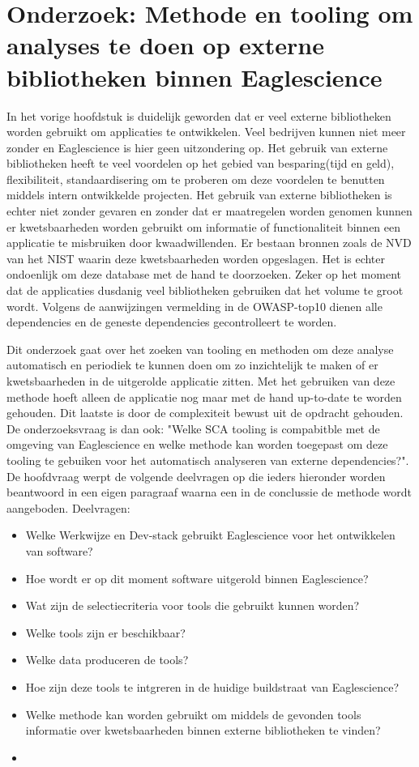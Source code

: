 
\chapter{Onderzoek: Methode en tooling om analyses te doen op externe bibliotheken binnen Eaglescience}\label{ch:onderzoek:-methode-en-tooling-om-analyses-te-doen-op-externe-bibliotheken-binnen-Eaglescience}
In het vorige hoofdstuk is duidelijk geworden dat er veel externe bibliotheken worden gebruikt om applicaties te ontwikkelen. Veel bedrijven kunnen niet meer zonder en Eaglescience is hier geen uitzondering op. Het gebruik van externe bibliotheken heeft te veel voordelen op het gebied van besparing(tijd en geld), flexibiliteit, standaardisering om te proberen om deze voordelen te benutten middels intern ontwikkelde projecten. Het gebruik van externe bibliotheken is echter niet zonder gevaren en zonder dat er maatregelen worden genomen kunnen er kwetsbaarheden worden gebruikt om informatie of functionaliteit binnen een applicatie te misbruiken door kwaadwillenden. Er bestaan bronnen zoals de NVD van het NIST waarin deze kwetsbaarheden worden opgeslagen. Het is echter ondoenlijk om deze database met de hand te doorzoeken. Zeker op het moment dat de applicaties dusdanig veel bibliotheken gebruiken dat het volume te groot wordt. Volgens de aanwijzingen vermelding in de OWASP-top10 dienen alle dependencies en de geneste dependencies gecontrolleert te worden.

Dit onderzoek gaat over het zoeken van tooling en methoden om deze analyse automatisch en periodiek te kunnen doen om zo inzichtelijk te maken of er kwetsbaarheden in de uitgerolde applicatie zitten. Met het gebruiken van deze methode hoeft alleen de applicatie nog maar met de hand up-to-date te worden gehouden. Dit laatste is door de complexiteit bewust uit de opdracht gehouden. De onderzoeksvraag is dan ook: "Welke SCA tooling is compabitble met de omgeving van Eaglescience en welke methode kan worden toegepast om deze tooling te gebuiken voor het automatisch analyseren van externe dependencies?". De hoofdvraag werpt de volgende deelvragen op die ieders hieronder worden beantwoord in een eigen paragraaf waarna een in de conclussie de methode wordt aangeboden.
Deelvragen:
\begin{itemize}
    \item Welke Werkwijze en Dev-stack gebruikt Eaglescience voor het ontwikkelen van software?
    \item Hoe wordt er op dit moment software uitgerold binnen Eaglescience?
    \item Wat zijn de selectiecriteria voor tools die gebruikt kunnen worden?
    \item Welke tools zijn er beschikbaar?
    \item Welke data produceren de tools?
    \item Hoe zijn deze tools te intgreren in de huidige buildstraat van Eaglescience?
    \item Welke methode kan worden gebruikt om middels de gevonden tools informatie over kwetsbaarheden binnen externe bibliotheken te vinden?
    \item
\end{itemize}




